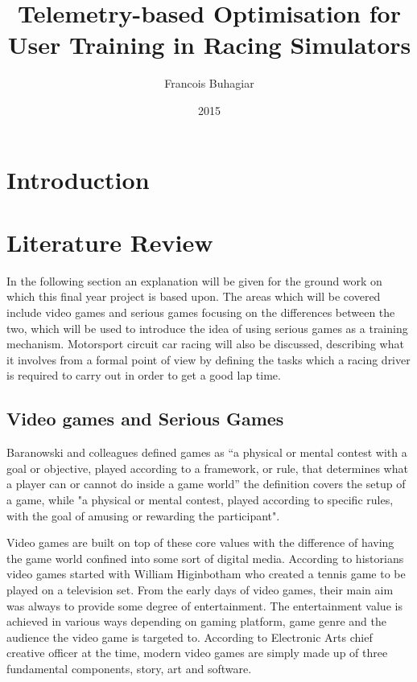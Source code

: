 \documentclass{article}
\title{Telemetry-based Optimisation for User Training in Racing Simulators}
\author{Francois Buhagiar}
\date{2015}
\begin{document}

\maketitle

\setcounter{page}{1}

\begin{abstract}
\end{abstract}

\newpage
\section{Introduction}

\newpage
\section{Literature Review}

In the following section an explanation will be given for the ground work on which this final year project is based upon. The areas which will be covered include video games and serious games focusing on the differences between the two, which will be used to introduce the idea of using serious games as a training mechanism. Motorsport circuit car racing will also be discussed, describing what it involves from a formal point of view by defining the tasks which a racing driver is required to carry out in order to get a good lap time. 

\subsection{Video games and Serious Games}

Baranowski and colleagues defined games as “a physical or mental contest with a goal or objective, played according to a framework, or rule, that determines what a player can or cannot do inside a game world” the definition covers the setup of a game, while  "a physical or mental contest, played according to specific rules, with the goal of amusing or rewarding the participant"\cite{yuserious}.

Video games are built on top of these core values with the difference of having the game world confined into some sort of digital media. According to historians video games started with William Higinbotham who created a tennis game to be played on a television set\cite{stanton2015brief}. From the early days of video games, their main aim was always to provide some degree of entertainment. The entertainment value is achieved in various ways depending on gaming platform, game genre and the audience the video game is targeted to. According to Electronic Arts chief creative officer at the time, modern video games are simply made up of three fundamental components, story, art and software\cite{zyda2005visual}.
\end{document}
